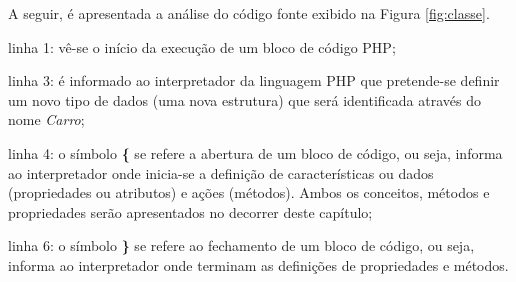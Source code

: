 \FloatBarrier 	%

A seguir, é apresentada a análise do código fonte exibido na Figura
\ref{fig:classe}.

\begin{alineas}
    \item linha 1: vê-se o início da execução de um bloco de código
    PHP;
    \item linha 3: é informado ao interpretador da linguagem \acs{PHP} que
    pretende-se definir um novo tipo de dados (uma nova estrutura) que será
    identificada através do nome \textit{Carro};
    \item linha 4: o símbolo \textbf{\{} se refere a abertura de um
    bloco de código, ou seja, informa ao interpretador onde inicia-se a definição de
    características ou dados (propriedades ou atributos) e ações (métodos).
    Ambos os conceitos, métodos e propriedades serão apresentados no decorrer
    deste capítulo;
    \item linha 6: o símbolo \textbf{\}} se refere ao fechamento de um
    bloco de código, ou seja, informa ao interpretador onde terminam as
    definições de propriedades e métodos.
\end{alineas}